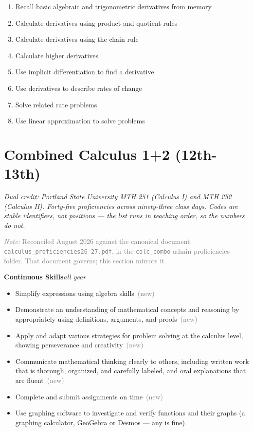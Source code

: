 \documentclass[11pt]{article}
\newcommand{\was}[1]{\newline{\small\textcolor{gray}{\textit{was:} #1}}}
\newcommand{\newprof}{\ {\small\textcolor{gray}{(new)}}}
\newcommand{\revnote}[1]{\par\medskip
  {\small\textcolor{gray}{\textit{Note:} #1}}}
\newcommand{\unithead}[2]{\par\medskip\noindent
  \textbf{#1}\hfill{\small\textit{#2}}\par\smallskip}
\begin{document}
\begin{enumerate}
\item Recall basic algebraic and trigonometric derivatives from memory
\item Calculate derivatives using product and quotient rules
\item Calculate derivatives using the chain rule
\item Calculate higher derivatives
\item Use implicit differentiation to find a derivative
\item Use derivatives to describe rates of change
\item Solve related rate problems
\item Use linear approximation to solve problems
\end{enumerate}

\section{Combined Calculus 1+2 (12th-13th)}

\noindent\textit{Dual credit: Portland State University MTH 251 (Calculus I) and
MTH 252 (Calculus II). Forty-five proficiencies across ninety-three class days.
Codes are stable identifiers, not positions --- the list runs in teaching order, so
the numbers do not.}
\revnote{Reconciled August 2026 against the canonical document
  \texttt{calculus\_proficiencies26-27.pdf}, in the \texttt{calc\_combo} admin
  proficiencies folder. That document governs; this section mirrors it.}

\unithead{Continuous Skills}{all year}
\begin{itemize}[leftmargin=3.4em,labelsep=0.5em,labelwidth=2.6em,align=left,itemsep=2pt]
\item[] Simplify expressions using algebra skills\newprof
\item[] Demonstrate an understanding of mathematical concepts and reasoning by
        appropriately using definitions, arguments, and proofs\newprof
\item[] Apply and adapt various strategies for problem solving at the calculus level,
        showing perseverance and creativity\newprof
\item[] Communicate mathematical thinking clearly to others, including written work
        that is thorough, organized, and carefully labeled, and oral explanations that
        are fluent\newprof
\item[] Complete and submit assignments on time\newprof
\item[] Use graphing software to investigate and verify functions and their graphs
        (a graphing calculator, GeoGebra or Desmos --- any is fine)
        \was{Use a graphing calculator}
\end{itemize}
\end{document}
